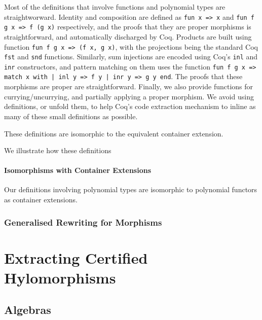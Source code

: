 \documentclass[a4paper, UKenglish, cleveref, autoref, thm-restate]{lipics-v2021}
\begin{document}
Most of the definitions that involve functions and polynomial types are
straightworward.  Identity and composition are defined as 
\texttt{fun x => x} and \texttt{fun f g x => f (g x)} 
respectively, and the proofs that they are proper morphisms is straightforward,
and automatically discharged by Coq. 
Products are built using function \texttt{fun f g x => (f x, g x)},
with the projections being the standard Coq  \texttt{fst} and
\texttt{snd} functions. Similarly, sum injections are encoded using
Coq's \texttt{inl} and \texttt{inr} constructors, and
pattern matching on them uses the function 
\texttt{fun f g x => match x with | inl y => f y | inr y => g y end}.
The proofs that these morphisms are proper are straightforward.  Finally, we
also provide functions for currying/uncurrying, and partially applying a proper
morphism. We avoid using definitions, or unfold them, to help Coq's code
extraction mechanism to inline as many of these small definitions as possible.

These definitions are isomorphic to the equivalent container extension.

We illustrate how these definitions
\paragraph*{Isomorphisms with Container Extensions} Our definitions involving
polynomial types are isomorphic to polynomial functors as container extensions.


\subsubsection{Generalised Rewriting for Morphisms}

\section{Extracting Certified Hylomorphisms}

\subsection{Algebras}
\end{document}
